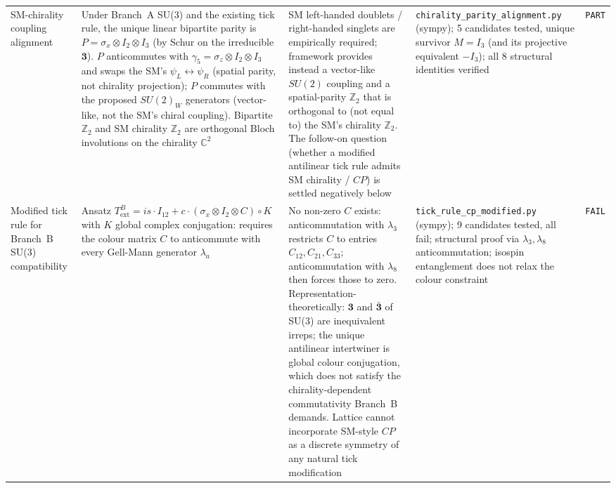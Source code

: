 {\begin{longtable}{@{}p{3.2cm}p{3.6cm}p{3.4cm}p{3.8cm}p{1.0cm}@{}}
SM-chirality coupling alignment
    & Under Branch~A SU(3) and the existing tick rule, the unique
      linear bipartite parity is $P = \sigma_x \otimes I_2 \otimes I_3$
      (by Schur on the irreducible $\mathbf{3}$).
      $P$ anticommutes with $\gamma_5 = \sigma_z \otimes I_2 \otimes I_3$
      and swaps the SM's $\psi_L \leftrightarrow \psi_R$ (spatial parity,
      not chirality projection);
      $P$ commutes with the proposed $SU(2)_W$ generators (vector-like,
      not the SM's chiral coupling).
      Bipartite $\mathbb{Z}_2$ and SM chirality $\mathbb{Z}_2$ are
      orthogonal Bloch involutions on the chirality $\mathbb{C}^2$
    & SM left-handed doublets / right-handed singlets are
      empirically required; framework provides instead a vector-like
      $SU(2)$ coupling and a spatial-parity $\mathbb{Z}_2$ that is
      orthogonal to (not equal to) the SM's chirality $\mathbb{Z}_2$.
      The follow-on question (whether a modified antilinear tick
      rule admits SM chirality / $CP$) is settled negatively below
    & \nolinkurl{chirality_parity_alignment.py} (sympy);
      5 candidates tested, unique survivor $M = I_3$ (and its
      projective equivalent $-I_3$); all 8 structural identities
      verified
    & \texttt{PART} \\

Modified tick rule for Branch~B SU(3) compatibility
    & Ansatz $T_\text{ext}^B = is \cdot I_{12} + c \cdot (\sigma_x
      \otimes I_2 \otimes C) \circ K$ with $K$ global complex
      conjugation: requires the colour matrix $C$ to anticommute with
      every Gell-Mann generator $\lambda_a$
    & No non-zero $C$ exists: anticommutation with $\lambda_3$
      restricts $C$ to entries $C_{12}, C_{21}, C_{33}$;
      anticommutation with $\lambda_8$ then forces those to zero.
      Representation-theoretically: $\mathbf{3}$ and $\bar{\mathbf{3}}$
      of SU(3) are inequivalent irreps; the unique antilinear
      intertwiner is global colour conjugation, which does not
      satisfy the chirality-dependent commutativity Branch~B
      demands.  Lattice cannot incorporate SM-style $CP$ as a
      discrete symmetry of any natural tick modification
    & \nolinkurl{tick_rule_cp_modified.py} (sympy);
      9 candidates tested, all fail; structural proof via
      $\lambda_3, \lambda_8$ anticommutation;
      isospin entanglement does not relax the colour constraint
    & \texttt{FAIL} \\


\end{longtable}}
